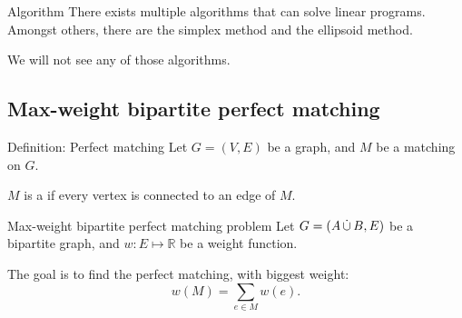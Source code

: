 \documentclass[a4paper]{article}
\begin{document}
\begin{parag}{Algorithm}
    There exists multiple algorithms that can solve linear programs. Amongst others, there are the simplex method and the ellipsoid method.

    We will not see any of those algorithms.
\end{parag}

\subsection{Max-weight bipartite perfect matching}

\begin{parag}{Definition: Perfect matching}
    Let $G = \left(V, E\right)$ be a graph, and $M$ be a matching on $G$.

    $M$ is a  if every vertex is connected to an edge of $M$.
\end{parag}

\begin{parag}{Max-weight bipartite perfect matching problem}
    Let $G = \left(A \dcup B, E\right)$ be a bipartite graph, and $w: E \mapsto \mathbb{R}$ be a weight function.

    The goal is to find the perfect matching, with biggest weight: 
    \[w\left(M\right) = \sum_{e \in M} w\left(e\right).\]
\end{parag}
\end{document}
